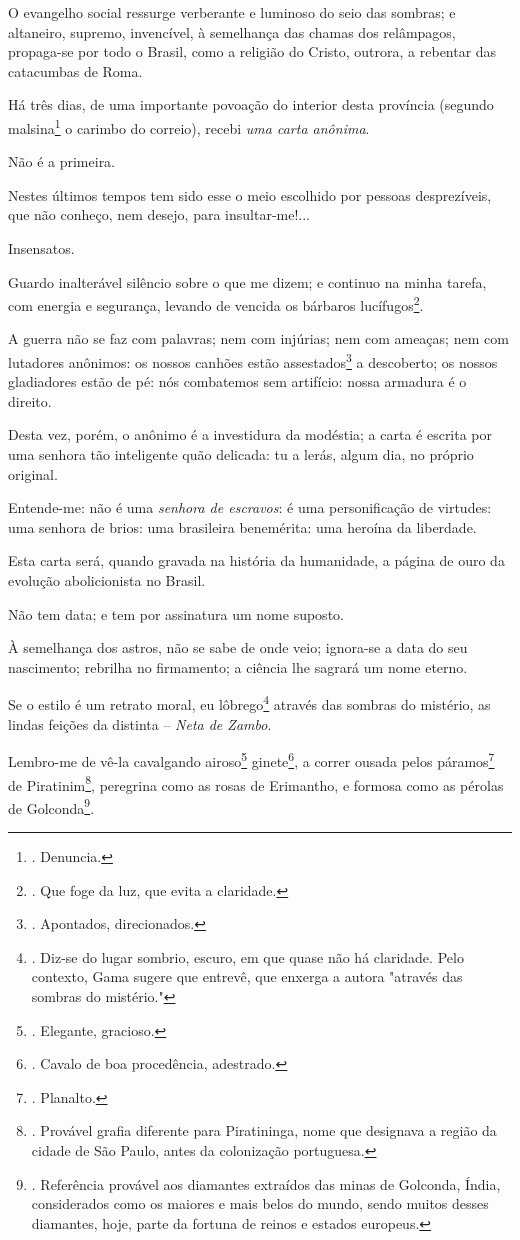 O evangelho social ressurge verberante e luminoso do seio das sombras; e
altaneiro, supremo, invencível, à semelhança das chamas dos relâmpagos,
propaga-se por todo o Brasil, como a religião do Cristo, outrora, a
rebentar das catacumbas de Roma.

Há três dias, de uma importante povoação do interior desta província
(segundo malsina\footnote{. Denuncia.} o carimbo do correio), recebi
\emph{uma carta anônima}.

Não é a primeira.

Nestes últimos tempos tem sido esse o meio escolhido por pessoas
desprezíveis, que não conheço, nem desejo, para insultar-me!...

Insensatos.

Guardo inalterável silêncio sobre o que me dizem; e continuo na minha
tarefa, com energia e segurança, levando de vencida os bárbaros
lucífugos\footnote{. Que foge da luz, que evita a claridade.}.

A guerra não se faz com palavras; nem com injúrias; nem com ameaças; nem
com lutadores anônimos: os nossos canhões estão assestados\footnote{.
  Apontados, direcionados.} a descoberto; os nossos gladiadores estão de
pé: nós combatemos sem artifício: nossa armadura é o direito.

Desta vez, porém, o anônimo é a investidura da modéstia; a carta é
escrita por uma senhora tão inteligente quão delicada: tu a lerás, algum
dia, no próprio original.

Entende-me: não é uma \emph{senhora de escravos}: é uma personificação
de virtudes: uma senhora de brios: uma brasileira benemérita: uma
heroína da liberdade.

Esta carta será, quando gravada na história da humanidade, a página de
ouro da evolução abolicionista no Brasil.

Não tem data; e tem por assinatura um nome suposto.

À semelhança dos astros, não se sabe de onde veio; ignora-se a data do
seu nascimento; rebrilha no firmamento; a ciência lhe sagrará um nome
eterno.

Se o estilo é um retrato moral, eu lôbrego\footnote{. Diz-se do lugar
  sombrio, escuro, em que quase não há claridade. Pelo contexto, Gama
  sugere que entrevê, que enxerga a autora "através das sombras do
  mistério."} através das sombras do mistério, as lindas feições da
distinta -- \emph{Neta de Zambo}.

Lembro-me de vê-la cavalgando airoso\footnote{. Elegante, gracioso.}
ginete\footnote{. Cavalo de boa procedência, adestrado.}, a correr
ousada pelos páramos\footnote{. Planalto.} de Piratinim\footnote{.
  Provável grafia diferente para Piratininga, nome que designava a
  região da cidade de São Paulo, antes da colonização portuguesa.},
peregrina como as rosas de Erimantho, e formosa como as pérolas de
Golconda\footnote{. Referência provável aos diamantes extraídos das
  minas de Golconda, Índia, considerados como os maiores e mais belos do
  mundo, sendo muitos desses diamantes, hoje, parte da fortuna de reinos
  e estados europeus.}.

